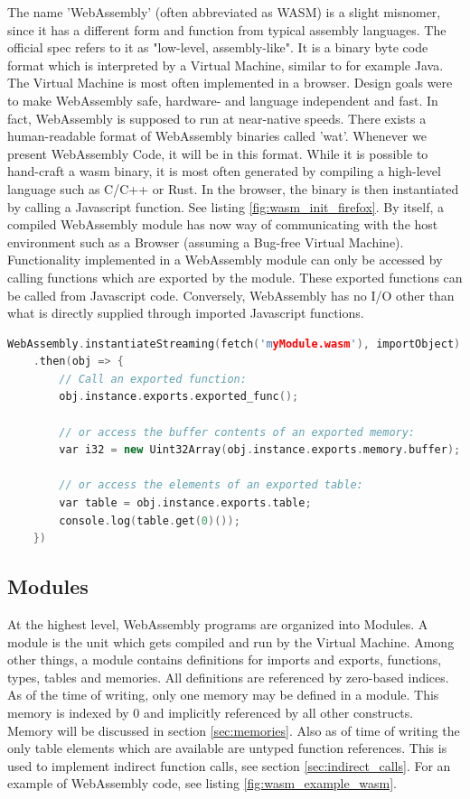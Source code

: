 \documentclass[sigconf]{acmart}
\begin{document}
The name 'WebAssembly' (often abbreviated as WASM) is a slight misnomer, since it has a different form and function from typical assembly languages. The official spec refers to it as "low-level, assembly-like". It is a binary byte code format which is interpreted by a Virtual Machine, similar to for example Java. The Virtual Machine is most often implemented in a browser. Design goals were to make WebAssembly safe, hardware- and language independent and fast. In fact, WebAssembly is supposed to run at near-native speeds. There exists a human-readable format of WebAssembly binaries called 'wat'. Whenever we present WebAssembly Code, it will be in this format. While it is possible to hand-craft a wasm binary, it is most often generated by compiling a high-level language such as C/C++ or Rust. In the browser, the binary is then instantiated by calling a Javascript function. See listing \ref{fig:wasm_init_firefox}. By itself, a compiled WebAssembly module has now way of communicating with the host environment such as a Browser (assuming a Bug-free Virtual Machine). Functionality implemented in a WebAssembly module can only be accessed by calling functions which are exported by the module. These exported functions can be called from Javascript code. Conversely, WebAssembly has no I/O other than what is directly supplied through imported Javascript functions. 

\begin{lstlisting}[language=C++, caption={How to intantiate a WebAssembly module using Javascript. (\url{https://developer.mozilla.org/en-US/docs/WebAssembly/Loading_and_running}).}, label=fig:wasm_example_c]
	WebAssembly.instantiateStreaming(fetch('myModule.wasm'), importObject)
	.then(obj => {
		// Call an exported function:
		obj.instance.exports.exported_func();

		// or access the buffer contents of an exported memory:
		var i32 = new Uint32Array(obj.instance.exports.memory.buffer);

		// or access the elements of an exported table:
 		var table = obj.instance.exports.table;
		console.log(table.get(0)());
	})
\end{lstlisting}

\subsection{Modules}
At the highest level, WebAssembly programs are organized into Modules.  A module is the unit which gets compiled and run by the Virtual Machine. Among other things, a module contains definitions for imports and exports, functions, types, tables and memories. All definitions are referenced by zero-based indices. As of the time of writing, only one memory may be defined in a module. This memory is indexed by 0 and implicitly referenced by all other constructs. Memory will be discussed in section \ref{sec:memories}. Also as of time of writing the only table elements which are available are untyped function references. This is used to implement indirect function calls, see section \ref{sec:indirect_calls}. For an example of WebAssembly code, see listing \ref{fig:wasm_example_wasm}.
\end{document}

